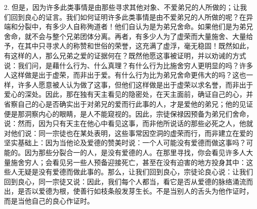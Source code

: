 2. 但是，因为许多此类事情是由那些寻求其他对象、不爱弟兄的人所做的；让我们回到良心的证言。我们如何证明许多此类事情是由不爱弟兄的人所做的呢？在异端和分裂中，有多少人自称殉道者！他们自认为是为弟兄舍命。如果他们是为弟兄舍命，就不会与整个兄弟团体分离。再者，有多少人为了虚荣而大量施舍、大量给予，在其中只寻求人的称赞和世俗的荣誉，这充满了虚浮，毫无稳固！既然如此，有这样的人，那么兄弟之爱的证据何在？既然他愿这事被证明，并以劝诫的方式说：我们问，是藉什么行为、什么真理？有什么行为比施舍穷人更明显的吗？许多人这样做是出于虚荣，而非出于爱。有什么行为比为弟兄舍命更伟大的吗？这也一样，许多人愿意被人认为做了这事，但他们这样做是出于虚荣以求名誉，而非出于爱心的深处。因此，那在独有天主看见的隐密处，在天主面前，确证自己的心，并省察自己的心是否确实出于对弟兄的爱而行此事的人，才是爱他的弟兄；他的见证便是那洞察内心的眼睛，是人不能窥视的。因此，宗徒保禄因预备为弟兄们舍命，说：然而，因为只有天主在他心中看见这事，而非他所说话的那些必死之人，他就对他们说：同一宗徒也在某处表明，这些事常因空洞的虚荣而行，而非建立在爱的坚实基础上：因为当他论及爱德的赞美时说：一个人可能没有爱德而做这事吗？可能的。因为那些分裂合一的人，是没有爱德的人。在那里寻找，你会看见许多人大量施舍穷人；会看见另一些人预备迎接死亡，甚至在没有迫害的地方投身其中：这些人无疑是没有爱德而做此事的。那么，让我们回到良心，宗徒论良心说：让我们回到良心，同一宗徒又说：因此，我们每个人都当，看它是否从爱德的脉络涌流而出，是否以爱德为根，使善行如枝条般发芽生长。不是当别人的舌头为他作证时，而是当他自己的良心作证时。\par

